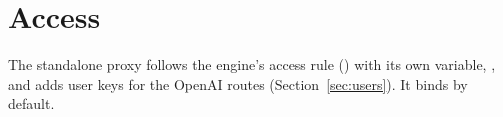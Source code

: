 \section{Access}

The standalone proxy follows the engine's access rule () with its own variable, , and adds user keys for the OpenAI routes (Section~\ref{sec:users}). It binds  by default.
